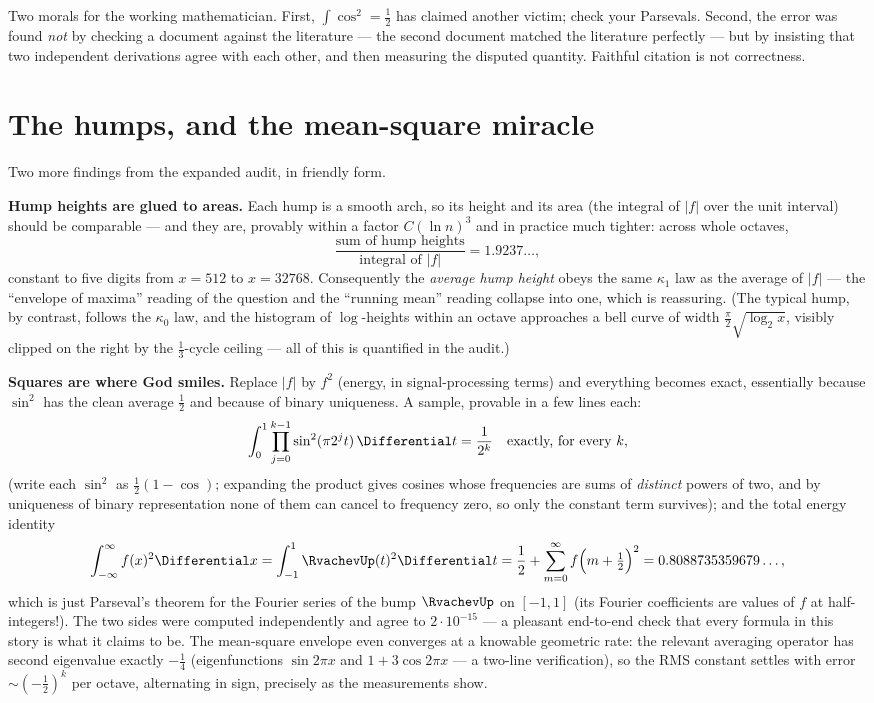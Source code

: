 \documentclass[11pt,oneside]{article}
\theoremstyle{remark}
\begin{document}
Two morals for the working mathematician.  First,
$\int\cos^2=\tfrac12$ has claimed another victim; check your
Parsevals.  Second, the error was found \emph{not} by checking a
document against the literature --- the second document matched the
literature perfectly --- but by insisting that two independent
derivations agree with each other, and then measuring the disputed
quantity.  Faithful citation is not correctness.

\section{The humps, and the mean-square miracle}
\label{sec:rms}

Two more findings from the expanded audit, in friendly form.

\textbf{Hump heights are glued to areas.}  Each hump is a smooth arch,
so its height and its area (the integral of $|f|$ over the unit
interval) should be comparable --- and they are, provably within a
factor $C(\ln n)^3$ and in practice much tighter: across whole
octaves,
\[
 \frac{\text{sum of hump heights}}{\text{integral of }|f|}
 =1.9237\ldots,
\]
constant to five digits from $x=512$ to $x=32768$.  Consequently the
\emph{average hump height} obeys the same $\kappa_1$ law as the
average of $|f|$ --- the ``envelope of maxima'' reading of the
question and the ``running mean'' reading collapse into one, which is
reassuring.  (The typical hump, by contrast, follows the
$\kappa_0$ law, and the histogram of $\log$-heights within an octave
approaches a bell curve of width $\tfrac\pi2\sqrt{\log_2x}$, visibly
clipped on the right by the $\tfrac13$-cycle ceiling --- all of this
is quantified in the audit.)

\textbf{Squares are where God smiles.}  Replace $|f|$ by $f^2$
(energy, in signal-processing terms) and everything becomes exact,
essentially because $\sin^2$ has the clean average $\tfrac12$ and
because of binary uniqueness.  A sample, provable in a few lines
each:
\[
 \int_0^1\prod_{j=0}^{k-1}\sin^2(\pi2^jt)\,\Differential t=\frac{1}{2^k}
 \quad\text{exactly, for every }k,
\]
(write each $\sin^2$ as $\tfrac12(1-\cos)$; expanding the product
gives cosines whose frequencies are sums of \emph{distinct} powers of
two, and by uniqueness of binary representation none of them can
cancel to frequency zero, so only the constant term survives);
and the total energy identity
\[
 \int_{-\infty}^{\infty}f(x)^2\Differential x
 =\int_{-1}^{1}\RvachevUp(t)^2\Differential t
 =\frac12+\sum_{m=0}^{\infty}f\Bigl(m+\tfrac12\Bigr)^{2}
 =0.8088735359679\ldots,
\]
which is just Parseval's theorem for the Fourier series of the bump
$\RvachevUp$ on $[-1,1]$ (its Fourier coefficients are values of $f$ at
half-integers!).  The two sides were computed independently and agree
to $2\cdot10^{-15}$ --- a pleasant end-to-end check that every formula
in this story is what it claims to be.  The mean-square envelope even
converges at a knowable geometric rate: the relevant averaging
operator has second eigenvalue exactly $-\tfrac14$ (eigenfunctions
$\sin2\pi x$ and $1+3\cos2\pi x$ --- a two-line verification), so the
RMS constant settles with error $\sim(-\tfrac12)^k$ per octave,
alternating in sign, precisely as the measurements show.
\end{document}
